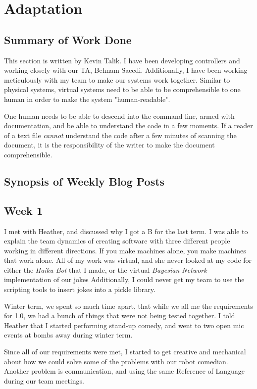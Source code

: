 \documentclass[onecolumn, draftclsnofoot,10pt, compsoc]{IEEEtran}
\begin{document}
\section{Adaptation}
\subsection{Summary of Work Done}
 This section is written by Kevin Talik. I have been developing controllers and working closely with our TA, Behnam Saeedi. Additionally, I have been working meticulously with my team to make our systems work together. Similar to physical systems, virtual systems need to be able to be comprehensible to one human in order to make the system "human-readable".

 One human needs to be able to descend into the command line, armed with documentation, and be able to understand the code in a few moments. If a reader of a text file \textit{cannot} understand the code after a few minutes of scanning the document, it is the responsibility of the writer to make the document comprehensible.
 \subsection{Synopsis of Weekly Blog Posts}

 \subsection{Week 1} I met with Heather, and discussed why I got a B for the last term. I was able to explain the team dynamics of creating software with three different people working in different directions. If you make machines alone, you make machines that work alone. All of my work was virtual, and she never looked at my code for either the \textit{Haiku Bot} that I made, or the virtual \textit{Bayesian Network} implementation of our jokes Additionally, I could never get my team to use the scripting tools to insert jokes into a pickle library.

Winter term, we spent so much time apart, that while we all me the requirements for 1.0, we had a bunch of things that were not being tested together. I told Heather that I started performing stand-up comedy, and went to two open mic events at bombs away during winter term.

Since all of our requirements were met, I started to get creative and mechanical about how we could solve some of the problems with our robot comedian. Another problem is communication, and using the same Reference of Language during our team meetings.
\end{document}
